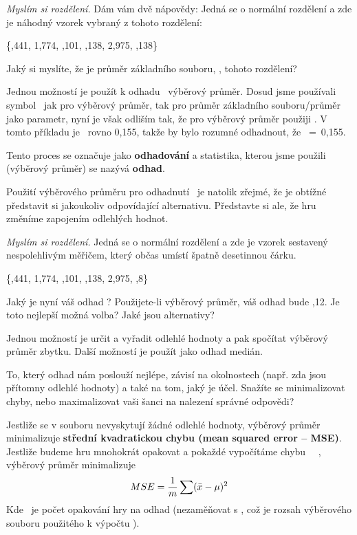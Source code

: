 \documentclass[12pt]{book}
\begin{document}
{\em Myslím si rozdělení.} Dám vám dvě nápovědy: Jedná se o normální rozdělení a zde je náhodný vzorek vybraný z tohoto rozdělení:

\{,441, 1,774, ,101, ,138, 2,975, ,138\}

Jaký si myslíte, že je průměr základního souboru, \mymu, tohoto rozdělení?

Jednou možností je použít k odhadu \mymu~výběrový průměr.  Dosud jsme používali symbol \mymu~jak pro výběrový průměr, tak pro průměr základního souboru/průměr jako parametr, nyní je však odliším tak, že pro výběrový průměr použiji \myxbar. V tomto příkladu je \myxbar~rovno 0,155, takže by bylo rozumné odhadnout, že \mymu~=~0,155.

Tento proces se označuje jako {\bf odhadování} a statistika, kterou jsme použili (výběrový průměr) se nazývá {\bf odhad}.

Použití výběrového průměru pro odhadnutí \mymu~je natolik zřejmé, že je obtížné představit si jakoukoliv odpovídající alternativu. Představte si ale, že hru změníme zapojením odlehlých hodnot.

{\em Myslím si rozdělení.}  Jedná se o normální rozdělení a zde je vzorek sestavený nespolehlivým měřičem, který občas umístí špatně desetinnou čárku.

\{,441, 1,774, ,101, ,138, 2,975, ,8\}

Jaký je nyní váš odhad \mymu?  Použijete-li výběrový průměr, váš odhad bude
,12.  Je toto nejlepší možná volba? Jaké jsou alternativy?

Jednou možností je určit a vyřadit odlehlé hodnoty a pak spočítat výběrový průměr zbytku. Další možností je použít jako odhad medián.

To, který odhad nám poslouží nejlépe, závisí na okolnostech (např. zda jsou přítomny odlehlé hodnoty) a také na tom, jaký je účel. Snažíte se minimalizovat chyby, nebo maximalizovat vaši šanci na nalezení správné odpovědi?

Jestliže se v souboru nevyskytují žádné odlehlé hodnoty, výběrový průměr minimalizuje {\bf střední kvadratickou chybu
(mean squared error -- MSE)}. Jestliže budeme hru mnohokrát opakovat a pokaždé vypočítáme chybu \myxbar~\minus~\mymu, výběrový průměr minimalizuje
%
\[ MSE = \frac{1}{m} \sum (\bar{x} - \mu)^2 \]
%
Kde \m~je počet opakování hry na odhad (nezaměňovat s \n, což je rozsah výběrového souboru použitého k výpočtu \myxbar).
\end{document}
